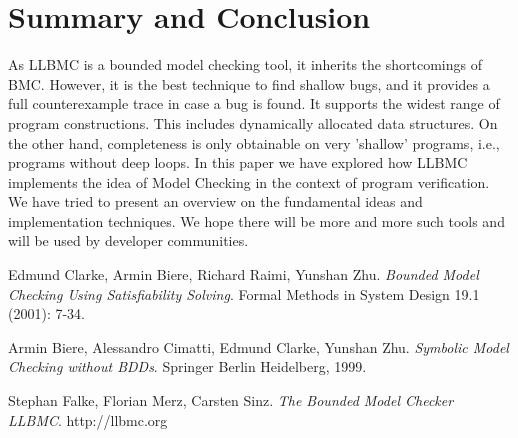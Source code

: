\documentclass[14pt]{article}
\begin{document}
{\section{Summary and Conclusion}\label{summary and conclusion}
As LLBMC is a bounded model checking tool, it inherits the shortcomings of BMC. However, it is the best technique to find shallow bugs, and it provides a full counterexample trace in case a bug is found. It supports the widest range of program constructions. This includes dynamically allocated data structures.
On the other hand, completeness is only obtainable on very 'shallow' programs, i.e., programs
without deep loops. 
In this paper we have explored how LLBMC implements the idea of Model Checking in the context of program verification. We have tried to present an overview on the fundamental ideas and implementation techniques. We hope there will be more and more such tools and will be used by developer communities. 

 \begin{comment} 
\begin{figure}[htb!]
  \begin{centering}
    \texttt{[image: figures/llvm\_ir\_grammar]}\par
  \end{centering}
  \caption{Abstract LLVM IR grammar}
  \label{fig:llvm_ir_grammar}
\end{figure}

\begin{figure}[htb!]
  \begin{centering}
    \texttt{[image: figures/llvm\_architecture]}\par
  \end{centering}
  \caption{LLVM architecture}
  \label{fig:llvm_architecture}
\end{figure}
\end{comment}

\begin{thebibliography}{9}

Edmund Clarke, Armin Biere, Richard Raimi, Yunshan Zhu.
\textit{Bounded Model Checking Using Satisfiability Solving}.
Formal Methods in System Design 19.1 (2001): 7-34.

Armin Biere, Alessandro Cimatti, Edmund Clarke, Yunshan Zhu.
\textit{Symbolic Model Checking without BDDs}. 
Springer Berlin Heidelberg, 1999.

Stephan Falke, Florian Merz, Carsten Sinz.
\textit{The Bounded Model Checker LLBMC}. 
http://llbmc.org


\end{thebibliography}}
\end{document}
